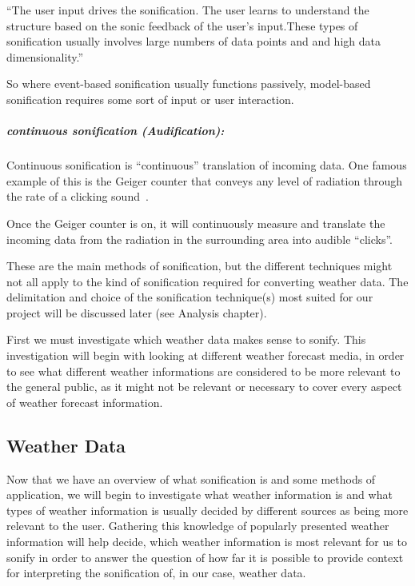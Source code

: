 \enquote{The user input drives the sonification. The user learns to understand the structure based on the sonic feedback of the user’s input.These types of sonification usually involves large numbers of data points and and high data dimensionality.}~\cite*[pp.17]{Hermann2011}

So where event-based sonification usually functions passively, model-based sonification requires some sort of input or user interaction.

\subparagraph{continuous sonification (Audification):} %
\label{subp:audification_continues_sonification_}
Continuous sonification is “continuous” translation of incoming data. One famous example of this is the Geiger counter that conveys any level of radiation through the rate of a clicking sound~\cite*{Wiki2014-2}.

Once the Geiger counter is on, it will continuously measure and translate the incoming data from the radiation in the surrounding area into audible “clicks”.

These are the main methods of sonification, but the different techniques might not all apply to the kind of sonification required for converting weather data. 
The delimitation and choice of the sonification technique(s) most suited for our project will be discussed later (see Analysis chapter).

First we must investigate which weather data makes sense to sonify. 
This investigation will begin with looking at different weather forecast media, in order to see what different weather informations are considered to be more relevant to the general public, as it might not be relevant or necessary to cover every aspect of weather forecast information.




\subsection{Weather Data} %
\label{sub:weather_data}

Now that we have an overview of what sonification is and some methods of application, we will begin to investigate what weather information is and what types of weather information is usually decided by different sources as being more relevant to the user. 
Gathering this knowledge of popularly presented weather information will help decide, which weather information is most relevant for us to sonify in order to answer the question of how far it is possible to provide context for interpreting the sonification of, in our case, weather data.


